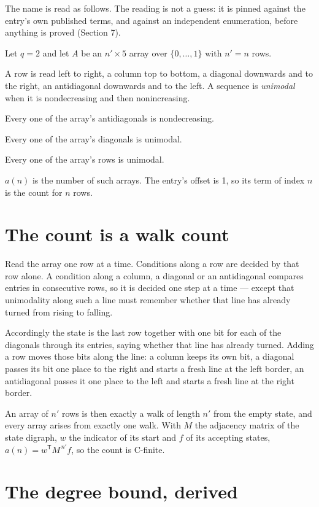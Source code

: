 \documentclass[11pt]{article}
\theoremstyle{definition}
\begin{document}
The name is read as follows. The reading is not a guess: it is pinned against the entry's own published terms, and against an independent enumeration, before anything is proved (Section 7).

Let $q = 2$ and let $A$ be an $n' \times 5$ array over $\{0,\dots,1\}$ with $n' = n$ rows.

A row is read left to right, a column top to bottom, a diagonal downwards and to the right, an antidiagonal downwards and to the left. A sequence is {\itshape unimodal} when it is nondecreasing and then nonincreasing.

Every one of the array's antidiagonals is nondecreasing.

Every one of the array's diagonals is unimodal.

Every one of the array's rows is unimodal.

$a(n)$ is the number of such arrays. The entry's offset is 1, so its term of index $n$ is the count for $n$ rows.

\section{The count is a walk count}

Read the array one row at a time. Conditions along a row are decided by that row alone. A condition along a column, a diagonal or an antidiagonal compares entries in consecutive rows, so it is decided one step at a time --- except that unimodality along such a line must remember whether that line has already turned from rising to falling.

Accordingly the state is the last row together with one bit for each of the diagonals through its entries, saying whether that line has already turned. Adding a row moves those bits along the line: a column keeps its own bit, a diagonal passes its bit one place to the right and starts a fresh line at the left border, an antidiagonal passes it one place to the left and starts a fresh line at the right border.

An array of $n'$ rows is then exactly a walk of length $n'$ from the empty state, and every array arises from exactly one walk. With $M$ the adjacency matrix of the state digraph, $w$ the indicator of its start and $f$ of its accepting states, $a(n) = w^{\mathsf T}M^{\,n'}f$, so the count is C-finite.

\section{The degree bound, derived}
\end{document}
